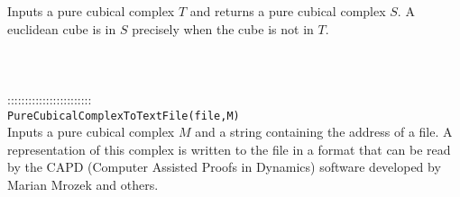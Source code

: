 \documentclass[a4paper,11pt]{report}
\begin{document}
{ Inputs a pure cubical complex $T$ and returns a pure cubical complex $S$. A euclidean cube is in $S$ precisely when the cube is not in $T$. \\
 \\
 \\
 \\
 ::::::::::::::::::::::::\\
 \texttt{PureCubicalComplexToTextFile(file,M)}\\
 

 Inputs a pure cubical complex $M$ and a string containing the address of a file. A representation of this
complex is written to the file in a format that can be read by the CAPD
(Computer Assisted Proofs in Dynamics) software developed by Marian Mrozek and
others. \\
 \\
 \\
 }

 
\end{document}
